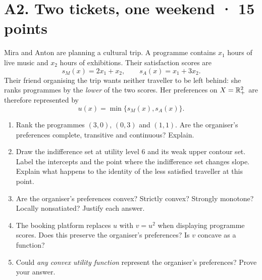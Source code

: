 \section*{A2. Two tickets, one weekend · 15 points}
Mira and Anton are planning a cultural trip. A programme contains $x_1$ hours of live music and $x_2$ hours of exhibitions. Their satisfaction scores are
\[
 s_M(x)=2x_1+x_2,\qquad s_A(x)=x_1+3x_2.
\]
Their friend organising the trip wants neither traveller to be left behind: she ranks programmes by the \emph{lower} of the two scores. Her preferences on $X=\mathbb R_+^2$ are therefore represented by
\[
 u(x)=\min\{s_M(x),s_A(x)\}.
\]
\begin{enumerate}[label=(\alph*)]
\item Rank the programmes $(3,0)$, $(0,3)$ and $(1,1)$. Are the organiser's preferences complete, transitive and continuous? Explain.
\item Draw the indifference set at utility level 6 and its weak upper contour set. Label the intercepts and the point where the indifference set changes slope. Explain what happens to the identity of the less satisfied traveller at this point.
\item Are the organiser's preferences convex? Strictly convex? Strongly monotone? Locally nonsatiated? Justify each answer.
\item The booking platform replaces $u$ with $v=u^2$ when displaying programme scores. Does this preserve the organiser's preferences? Is $v$ concave as a function?
\item Could \emph{any convex utility function} represent the organiser's preferences? Prove your answer.
\end{enumerate}
\clearpage
